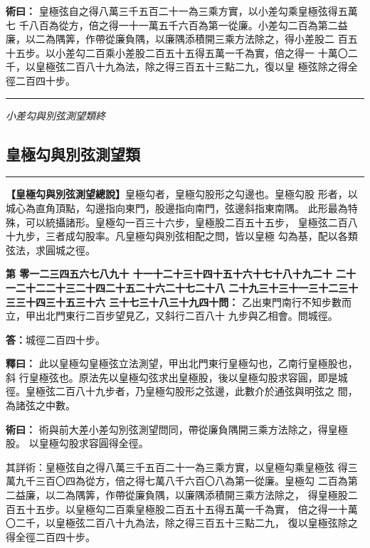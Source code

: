 \documentclass[11pt,a4paper]{article}
\newcommand{\longline}{\noindent\rule{\textwidth}{0.4pt}}
\newcounter{probnum}
\newcommand{\chnum}[1]{%
  \ifcase#1 零\or 一\or 二\or 三\or 四\or 五\or 六\or 七\or 八\or 九\or 十\or
    十一\or 十二\or 十三\or 十四\or 十五\or 十六\or 十七\or 十八\or 十九\or 二十\or
    二十一\or 二十二\or 二十三\or 二十四\or 二十五\or 二十六\or 二十七\or 二十八\or
    二十九\or 三十\or 三十一\or 三十二\or 三十三\or 三十四\or 三十五\or 三十六\or
    三十七\or 三十八\or 三十九\or 四十\fi}
\newcommand{\problem}[1]{\stepcounter{probnum}\par\noindent\textbf{第\chnum{\value{probnum}}問：}#1\par}
\newcommand{\answer}[1]{\par\noindent\textbf{答：}#1\par}
\newcommand{\shiyi}[1]{\par\noindent\textbf{釋曰：}#1\par}
\newcommand{\shuyue}[1]{\par\noindent\textbf{術曰：}#1\par}
\begin{document}
\shuyue{
皇極弦自之得八萬三千五百二十一為三乘方實，以小差勾乘皇極弦得五萬七
千八百為從方，倍之得一十一萬五千六百為第一從廉。小差勾二百為第二益
廉，以二為隅筭，作帶從廉負隅，以廉隅添積開三乘方法除之，得小差股二
百五十五步。以小差勾二百乘小差股二百五十五得五萬一千為實，倍之得一
十萬〇二千，以皇極弦二百八十九為法，除之得三百五十三點二九，復以皇
極弦除之得全徑二百四十步。
}

\vspace{0.5cm}
\longline
\begin{center}
\textit{小差勾與別弦測望類終}
\end{center}

\newpage
\setcounter{probnum}{0}

\subsection*{皇極勾與別弦測望類}
\vspace{0.3cm}
\longline
\vspace{0.3cm}

\noindent
\textbf{【皇極勾與別弦測望總說】}皇極勾者，皇極勾股形之勾邊也。皇極勾股
形者，以城心為直角頂點，勾邊指向東門，股邊指向南門，弦邊斜指東南隅。
此形最為特殊，可以統攝諸形。皇極勾一百三十六步，皇極股二百五十五步，
皇極弦二百八十九步，三者成勾股率。凡皇極勾與別弦相配之問，皆以皇極
勾為基，配以各類弦法，求圓城之徑。

\problem{
乙出東門南行不知步數而立，甲出北門東行二百步望見乙，又斜行二百八十
九步與乙相會。問城徑。
}

\answer{城徑二百四十步。}

\shiyi{
此以皇極勾皇極弦立法測望，甲出北門東行皇極勾也，乙南行皇極股也，斜
行皇極弦也。原法先以皇極勾弦求出皇極股，後以皇極勾股求容圓，即是城
徑。皇極弦二百八十九步者，乃皇極勾股形之弦邊，此數介於通弦與明弦之
間，為諸弦之中數。
}

\shuyue{
術與前大差小差勾別弦測望問同，帶從廉負隅開三乘方法除之，得皇極股。
以皇極勾股求容圓得全徑。

其詳術：皇極弦自之得八萬三千五百二十一為三乘方實，以皇極勾乘皇極弦
得三萬九千三百〇四為從方，倍之得七萬八千六百〇八為第一從廉。皇極勾
二百為第二益廉，以二為隅筭，作帶從廉負隅，以廉隅添積開三乘方法除之，
得皇極股二百五十五步。以皇極勾二百乘皇極股二百五十五得五萬一千為實，
倍之得一十萬〇二千，以皇極弦二百八十九為法，除之得三百五十三點二九，
復以皇極弦除之得全徑二百四十步。
}
\end{document}
